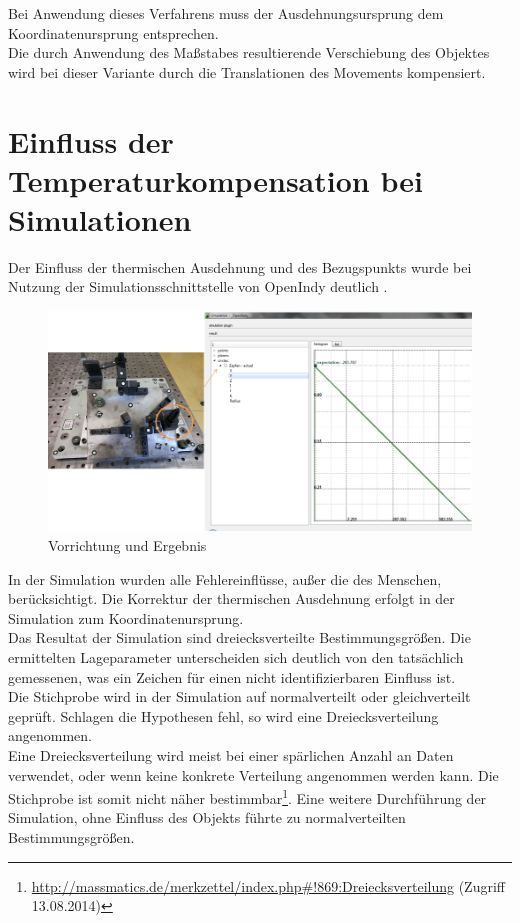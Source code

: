 Bei Anwendung dieses Verfahrens muss der Ausdehnungsursprung dem Koordinatenursprung entsprechen.\\
Die durch Anwendung des Maßstabes resultierende Verschiebung des Objektes wird bei dieser Variante durch die Translationen des Movements kompensiert. 

\section{Einfluss der Temperaturkompensation bei Simulationen}\label{sec:simulationen}

Der Einfluss der thermischen Ausdehnung und des Bezugspunkts wurde bei Nutzung der Simulationsschnittstelle von OpenIndy deutlich \cite{Lux2014}.

\begin{figure}[H]
\label{fig:simulationVorrichtung}
\centering
	\includegraphics[scale=2.0]{bilder/vorrichtungsimulation}
	\caption{Vorrichtung und Ergebnis}
\end{figure}

In der Simulation wurden alle Fehlereinflüsse, außer die des Menschen, berücksichtigt. Die Korrektur der thermischen Ausdehnung erfolgt in der Simulation zum Koordinatenursprung.\\
Das Resultat der Simulation sind dreiecksverteilte Bestimmungsgrößen.
Die ermittelten Lageparameter unterscheiden sich deutlich von den tatsächlich gemessenen, was ein Zeichen für einen nicht identifizierbaren Einfluss ist.\\
Die Stichprobe wird in der Simulation auf normalverteilt oder gleichverteilt geprüft. Schlagen die Hypothesen fehl, so wird eine Dreiecksverteilung angenommen.\\
Eine Dreiecksverteilung wird meist bei einer spärlichen Anzahl an Daten verwendet, oder wenn keine konkrete Verteilung angenommen werden kann. Die Stichprobe ist somit nicht näher bestimmbar\footnote{\url{http://massmatics.de/merkzettel/index.php\#!869:Dreiecksverteilung} (Zugriff 13.08.2014)}.
Eine weitere Durchführung der Simulation, ohne Einfluss des Objekts führte zu normalverteilten Bestimmungsgrößen.\\

